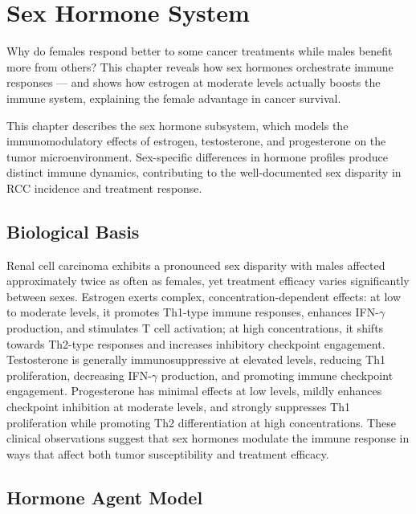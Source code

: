 \chapter{Sex Hormone System}
\label{ch:sex-hormones}

Why do females respond better to some cancer treatments while males benefit more from others? This chapter reveals how sex hormones orchestrate immune responses --- and shows how estrogen at moderate levels actually boosts the immune system, explaining the female advantage in cancer survival.

This chapter describes the sex hormone subsystem, which models the immunomodulatory effects of estrogen, testosterone, and progesterone on the tumor microenvironment. Sex-specific differences in hormone profiles produce distinct immune dynamics, contributing to the well-documented sex disparity in RCC incidence and treatment response.

\section{Biological Basis}
\label{sec:hormone-bio}

Renal cell carcinoma exhibits a pronounced sex disparity with males affected approximately twice as often as females, yet treatment efficacy varies significantly between sexes. Estrogen exerts complex, concentration-dependent effects: at low to moderate levels, it promotes Th1-type immune responses, enhances IFN-$\gamma$ production, and stimulates T cell activation; at high concentrations, it shifts towards Th2-type responses and increases inhibitory checkpoint engagement. Testosterone is generally immunosuppressive at elevated levels, reducing Th1 proliferation, decreasing IFN-$\gamma$ production, and promoting immune checkpoint engagement. Progesterone has minimal effects at low levels, mildly enhances checkpoint inhibition at moderate levels, and strongly suppresses Th1 proliferation while promoting Th2 differentiation at high concentrations. These clinical observations suggest that sex hormones modulate the immune response in ways that affect both tumor susceptibility and treatment efficacy.

\section{Hormone Agent Model}
\label{sec:hormone-agent}

